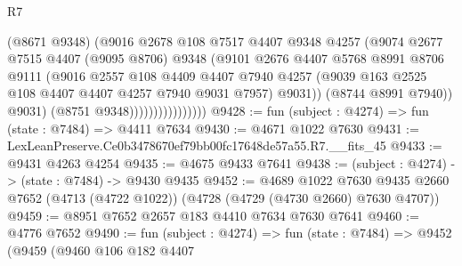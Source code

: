 \begin{lexlean}{R7}
\begin{coremodule}
                                  (@8671 @9348)
                                  (@9016
                                    @2678
                                    @108
                                    @7517
                                    @4407
                                    @9348
                                    @4257
                                    (@9074
                                      @2677
                                      @7515
                                      @4407
                                      (@9095 @8706)
                                      @9348
                                      (@9101
                                        @2676
                                        @4407
                                        @5768
                                        @8991
                                        @8706
                                        @9111
                                        (@9016
                                          @2557
                                          @108
                                          @4409
                                          @4407
                                          @7940
                                          @4257
                                          (@9039
                                            @163
                                            @2525
                                            @108
                                            @4407
                                            @4407
                                            @4257
                                            @7940
                                            @9031
                                            @7957)
                                          @9031))
                                      (@8744 @8991 @7940))
                                    @9031)
                                  (@8751 @9348))))))))))))))))
@9428 := fun (subject : @4274) => fun (state : @7484) => @4411 @7634
@9430 := @4671 @1022 @7630
@9431 := LexLeanPreserve.Ce0b3478670ef79bb00fc17648de57a55.R7.__fits_45
@9433 := @9431 @4263 @4254
@9435 := @4675 @9433 @7641
@9438 := (subject : @4274) -> (state : @7484) -> @9430 @9435
@9452 := @4689
    @1022
    @7630
    @9435
    @2660
    @7652
    (@4713 (@4722 @1022))
    (@4728 (@4729 (@4730 @2660) @7630 @4707))
@9459 := @8951 @7652 @2657 @183 @4410 @7634 @7630 @7641
@9460 := @4776 @7652
@9490 := fun (subject : @4274) =>
  fun (state : @7484) =>
  @9452
    (@9459
      (@9460
        @106
        @182
        @4407

\end{coremodule}
\end{lexlean}
